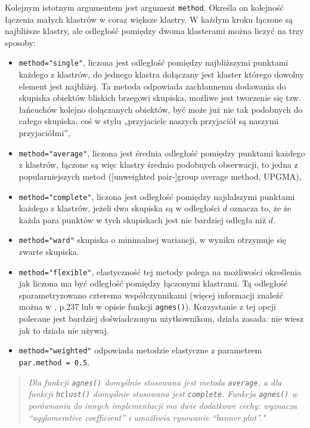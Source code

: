 \documentclass[polish,]{book}
\begin{document}
Kolejnym istotnym argumentem jest argument \texttt{method}. Określa on kolejność łączenia małych klastrów w coraz większe klastry. W każdym kroku łączone są najbliższe klastry, ale odległość pomiędzy dwoma klasterami można liczyć na trzy sposoby:

\begin{itemize}
\item
  \texttt{method="single"}, liczona jest odległość pomiędzy najbliższymi punktami każdego z klastrów, do jednego klastra dołączany jest klaster którego dowolny element jest najbliżej. Ta metoda odpowiada zachłannemu dodawania do skupiska
  obiektów bliskich brzegowi skupiska, możliwe jest tworzenie się tzw. łańcuchów
  kolejno dołączanych obiektów, być może już nie tak podobnych do całego skupiska, coś w stylu „przyjaciele naszych przyjaciół są naszymi przyjaciółmi'',
\item
  \texttt{method="average"}, liczona jest średnia odległość pomiędzy punktami każdego
  z klastrów, łączone są więc klastry średnio podobnych obserwacji, to jedna z
  popularniejszych metod ({[}unweighted pair-{]}group average method, UPGMA),
\item
  \texttt{method="complete"}, liczona jest odległość pomiędzy najdalszymi punktami
  każdego z klastrów, jeżeli dwa skupiska są w odległości \(d\) oznacza to, że że
  każda para punktów w tych skupiskach jest nie bardziej odległa niż \(d\).
\item
  \texttt{method="ward"} skupiska o minimalnej wariancji, w wyniku otrzymuje się zwarte skupiska.
\item
  \texttt{method="flexible"}, elastyczność tej metody polega na możliwości określenia
  jak liczona ma być odległość pomiędzy łączonymi klastrami. Tą odległość sparametryzowano czterema współczynnikami (więcej informacji znaleźć można w \citet{KR1990}, p.237 lub w opisie funkcji \texttt{agnes()}). Korzystanie z tej opcji polecane jest
  bardziej doświadczonym użytkownikom, działa zasada: nie wiesz jak to działa
  nie używaj.
\item
  \texttt{method="weighted"} odpowiada metodzie elastyczne z parametrem \texttt{par.method\ =\ 0.5}.
\end{itemize}

\begin{quote}
\emph{Dla funkcji \texttt{agnes()} domyślnie stosowana jest metoda \texttt{average}, a dla
funkcji \texttt{hclust()} domyślnie stosowana jest \texttt{complete}. Funkcja \texttt{agnes()}
w porównaniu do innych implementacji ma dwie dodatkowe cechy: wyznacza ``agglomerative coefficient'' i umożliwia rysowanie ``banner.plot''."}
\end{quote}
\end{document}
